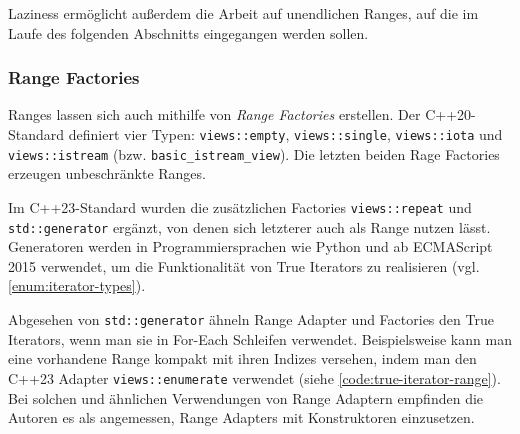 \documentclass[runningheads]{llncs}
\begin{document}
\begin{figure}
	\vspace{-2em}
\end{figure}

\noindent Laziness ermöglicht außerdem die Arbeit auf unendlichen Ranges, auf die im Laufe des folgenden Abschnitts eingegangen werden sollen.

\subsubsection{Range Factories}

Ranges lassen sich auch mithilfe von \textit{Range Factories} erstellen.
Der C++20-Standard definiert vier Typen: \texttt{views::empty}, \texttt{views::single}, \texttt{views::iota} und \texttt{views::istream} (bzw. \texttt{basic\_istream\_view}).
Die letzten beiden Rage Factories erzeugen unbeschränkte Ranges.

Im C++23-Standard wurden die zusätzlichen Factories \texttt{views::repeat} und \texttt{std::generator} ergänzt, von denen sich letzterer auch als Range nutzen lässt.
Generatoren werden in Programmiersprachen wie Python und ab ECMAScript 2015 verwendet, um die Funktionalität von True Iterators zu realisieren (vgl. \ref{enum:iterator-types}).

Abgesehen von \texttt{std::generator} ähneln Range Adapter und Factories den True Iterators, wenn man sie in For-Each Schleifen verwendet.
Beispielsweise kann man eine vorhandene Range kompakt mit ihren Indizes versehen, indem man den C++23 Adapter \texttt{views::enumerate} verwendet (siehe \autoref{code:true-iterator-range}).
Bei solchen und ähnlichen Verwendungen von Range Adaptern empfinden die Autoren es als angemessen, Range Adapters mit Konstruktoren einzusetzen.
\end{document}
